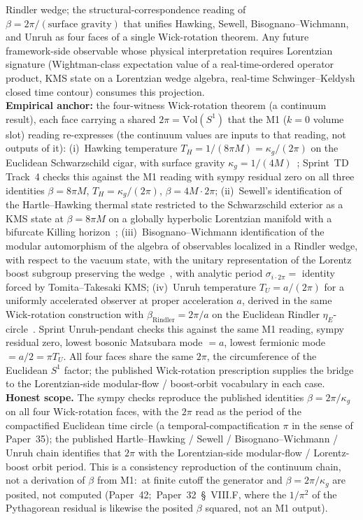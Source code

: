 \documentclass[11pt]{article}
\begin{document}
Rindler wedge; the structural-correspondence reading of
$\beta = 2\pi / (\text{surface gravity})$ that unifies Hawking,
Sewell, Bisognano--Wichmann, and Unruh as four faces of a single
Wick-rotation theorem.  Any future framework-side observable whose
physical interpretation requires Lorentzian signature (Wightman-class
expectation value of a real-time-ordered operator product, KMS state
on a Lorentzian wedge algebra, real-time Schwinger--Keldysh closed
time contour) consumes this projection.\\
\textbf{Empirical anchor:} the four-witness Wick-rotation theorem
(a continuum result), each face carrying a shared
$2\pi = \mathrm{Vol}(S^1)$ that the M1 ($k = 0$ volume slot) reading
re-expresses (the continuum values are inputs to that reading, not
outputs of it):
(i)~Hawking temperature $T_H = 1/(8\pi M) = \kappa_g / (2\pi)$ on the
Euclidean Schwarzschild cigar, with surface gravity
$\kappa_g = 1/(4M)$~\cite{hartle_hawking1976};
Sprint~TD Track~4 checks this against the M1 reading with sympy
residual zero on all three identities $\beta = 8\pi M$, $T_H = \kappa_g/(2\pi)$,
$\beta = 4M \cdot 2\pi$;
(ii)~Sewell's identification of the Hartle--Hawking thermal state
restricted to the Schwarzschild exterior as a KMS state at
$\beta = 8\pi M$ on a globally hyperbolic Lorentzian manifold with
a bifurcate Killing horizon~\cite{sewell1982};
(iii)~Bisognano--Wichmann identification of the modular automorphism
of the algebra of observables localized in a Rindler wedge, with
respect to the vacuum state, with the unitary representation of the
Lorentz boost subgroup preserving the
wedge~\cite{bisognano_wichmann1976}, with analytic period
$\sigma_{i \cdot 2\pi} = $ identity forced by Tomita--Takesaki KMS;
(iv)~Unruh temperature $T_U = a / (2\pi)$ for a uniformly accelerated
observer at proper acceleration $a$, derived in the same Wick-rotation
construction with $\beta_{\mathrm{Rindler}} = 2\pi / a$ on the
Euclidean Rindler $\eta_E$-circle~\cite{unruh1976}.  Sprint
Unruh-pendant checks this against the same M1 reading,
sympy residual zero, lowest bosonic Matsubara mode $= a$, lowest
fermionic mode $= a/2 = \pi T_U$.
All four faces share the same $2\pi$, the circumference of the
Euclidean $S^1$ factor; the published Wick-rotation prescription
supplies the bridge to the Lorentzian-side modular-flow / boost-orbit
vocabulary in each case.\\
\textbf{Honest scope.}  The sympy checks reproduce the published
identities $\beta = 2\pi / \kappa_g$ on all four Wick-rotation faces,
with the $2\pi$ read as the period of the compactified Euclidean time
circle (a temporal-compactification $\pi$ in the sense of Paper~35);
the published Hartle--Hawking / Sewell / Bisognano--Wichmann / Unruh
chain identifies that $2\pi$ with the Lorentzian-side modular-flow /
Lorentz-boost orbit period.  This is a consistency reproduction of the
continuum chain, not a derivation of $\beta$ from M1:\ at finite cutoff
the generator and $\beta = 2\pi/\kappa_g$ are posited, not computed
(Paper~42;\ Paper~32~\S~VIII.F, where the $1/\pi^2$ of the
Pythagorean residual is likewise the posited $\beta$ squared, not an
M1 output).
\end{document}
